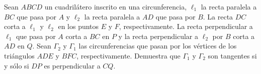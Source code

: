 Sean $ABCD$ un cuadrilátero inscrito en una circunferencia, $\ell_1$ la recta paralela a $BC$ que
pasa por $A$ y $\ell_2$ la recta paralela a $AD$ que pasa por $B$. La recta $DC$ corta a $\ell_1$ y $\ell_2$ en los
puntos $E$ y $F$, respectivamente. La recta perpendicular a $\ell_1$ que pasa por $A$ corta a $BC$ en
$P$ y la recta perpendicular a $\ell_2$ por $B$ corta a $AD$ en $Q$. Sean $\Gamma_2$ y $\Gamma_1$ las circunferencias
que pasan por los vértices de los triángulos $ADE$ y $BFC$, respectivamente. Demuestra
que $\Gamma_1$ y $\Gamma_2$ son tangentes si y sólo si $DP$ es perpendicular a $CQ$.